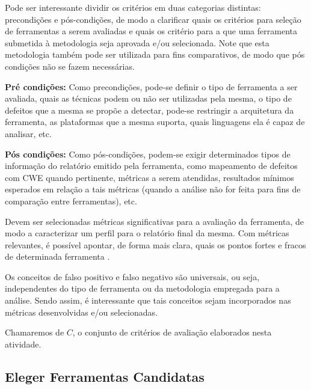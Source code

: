 Pode ser interessante dividir os critérios em duas categorias distintas: precondições e pós-condições, de modo a clarificar quais os critérios para seleção de ferramentas a serem avaliadas e quais os critério para a que uma ferramenta submetida à metodologia seja aprovada e/ou selecionada. Note que esta metodologia também pode ser utilizada para fins comparativos, de modo que pós condições não se fazem necessárias.

\textbf{Pré condições:} Como precondições, pode-se definir o tipo de ferramenta a ser avaliada, quais as técnicas podem ou não ser utilizadas pela mesma, o tipo de defeitos que a mesma se propõe a detectar, pode-se restringir a arquitetura da ferramenta, as plataformas que a mesma suporta, quais linguagens ela é capaz de analisar, etc.

\textbf{Pós condições:} Como pós-condições, podem-se exigir determinados tipos de informação do relatório emitido pela ferramenta, como mapeamento de defeitos com CWE quando pertinente, métricas a serem atendidas, resultados mínimos esperados em relação a tais métricas (quando a análise não for feita para fins de comparação entre ferramentas), etc.

Devem ser selecionadas métricas significativas para a avaliação da ferramenta, de modo a caracterizar um perfil para o relatório final da mesma. Com métricas relevantes, é possível apontar, de forma mais clara, quais os pontos fortes e fracos de determinada ferramenta \cite{nsa}.

Os conceitos de falso positivo e falso negativo são universais, ou seja, independentes do tipo de ferramenta ou da metodologia empregada para a análise. Sendo assim, é interessante que tais conceitos sejam incorporados nas métricas desenvolvidas e/ou selecionadas.

Chamaremos de $C$, o conjunto de critérios de avaliação elaborados nesta atividade.

\subsection{Eleger Ferramentas Candidatas}

